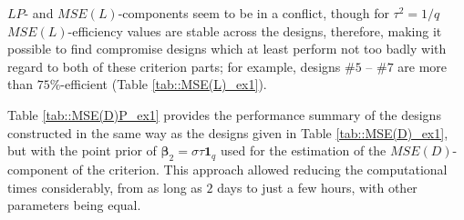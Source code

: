 $LP$- and $MSE(L)$-components seem to be in a conflict, though for $\tau^2=1/q$ $MSE(L)$-efficiency values are stable across the designs, therefore, making it possible to find compromise designs which at least perform not too badly with regard to both of these criterion parts; for example, designs \#$5$ -- \#$7$ are more than $75\%$-efficient (Table \ref{tab::MSE(L)_ex1}).   

Table \ref{tab::MSE(D)P_ex1} provides the performance summary of the designs constructed in the same way as the designs given in Table \ref{tab::MSE(D)_ex1}, but with the point prior of $\bm{\beta}_2=\sigma\tau\bm{1}_q$ used for the estimation of the $MSE(D)$-component of the criterion. This approach allowed reducing the computational times considerably, from as long as $2$ days to just a few hours, with other parameters being equal.

